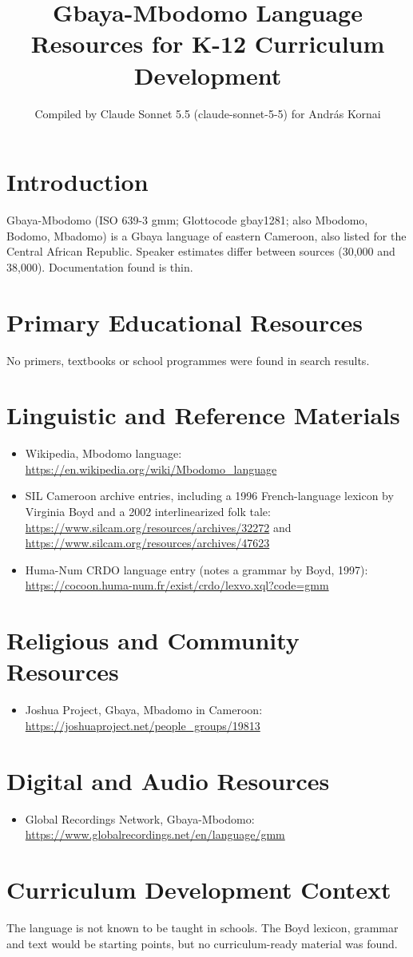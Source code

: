 \documentclass[12pt]{article}
\title{Gbaya-Mbodomo Language Resources for K-12 Curriculum Development}
\author{Compiled by Claude Sonnet 5.5 (claude-sonnet-5-5) for Andr\'as Kornai}
\date{}
\begin{document}
\maketitle

\section{Introduction}
Gbaya-Mbodomo (ISO 639-3 gmm; Glottocode gbay1281; also Mbodomo, Bodomo, Mbadomo) is a Gbaya language of eastern Cameroon, also listed for the Central African Republic. Speaker estimates differ between sources (30,000 and 38,000). Documentation found is thin.

\section{Primary Educational Resources}
No primers, textbooks or school programmes were found in search results.

\section{Linguistic and Reference Materials}
\begin{itemize}
\item Wikipedia, Mbodomo language: \url{https://en.wikipedia.org/wiki/Mbodomo_language}
\item SIL Cameroon archive entries, including a 1996 French-language lexicon by Virginia Boyd and a 2002 interlinearized folk tale: \url{https://www.silcam.org/resources/archives/32272} and \url{https://www.silcam.org/resources/archives/47623}
\item Huma-Num CRDO language entry (notes a grammar by Boyd, 1997): \url{https://cocoon.huma-num.fr/exist/crdo/lexvo.xql?code=gmm}
\end{itemize}

\section{Religious and Community Resources}
\begin{itemize}
\item Joshua Project, Gbaya, Mbadomo in Cameroon: \url{https://joshuaproject.net/people_groups/19813}
\end{itemize}

\section{Digital and Audio Resources}
\begin{itemize}
\item Global Recordings Network, Gbaya-Mbodomo: \url{https://www.globalrecordings.net/en/language/gmm}
\end{itemize}

\section{Curriculum Development Context}
The language is not known to be taught in schools. The Boyd lexicon, grammar and text would be starting points, but no curriculum-ready material was found.
\end{document}
